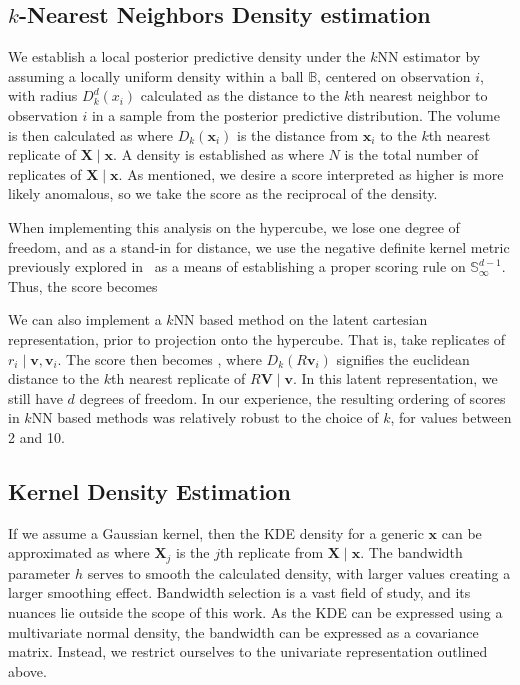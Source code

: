 \subsection{$k$-Nearest Neighbors Density estimation}
We establish a local posterior predictive density under the $k$NN estimator by 
  assuming a locally uniform density within a ball $\mathbb{B}$, centered on 
  observation $i$, with radius $D_{k}^d(x_i)$ calculated as the distance to the 
  $k$th nearest neighbor to observation $i$ in a sample from the posterior 
  predictive distribution. The volume is then calculated as
   where $D_k(\bm{x}_i)$ is the distance from 
  $\bm{x}_i$ to the $k$th nearest replicate of $\bm{X}\mid\bm{x}$.  A density is
  established as  where $N$ is the total number of 
  replicates of $\bm{X}\mid\bm{x}$.  As mentioned, we desire a score interpreted
  as higher is more likely anomalous, so we take the score as the reciprocal of 
  the density.

When implementing this analysis on the hypercube, we lose one degree of freedom,
  and as a stand-in for distance, we use the negative definite kernel metric 
  previously explored in~\cite{trubey:pg} as a means of establishing a proper 
  scoring rule on $\mathbb{S}_{\infty}^{d-1}$.  Thus, the score becomes
  
  We can also implement a $k$NN based method on the latent cartesian
  representation, prior to projection onto the hypercube.  That is, take replicates
  of $r_i\mid \bm{v},\bm{v}_i$.  The score then becomes ,
  where $D_k(R\bm{v}_i)$ signifies the euclidean distance to the $k$th nearest
  replicate of $R\bm{V}\mid\bm{v}$.  In this latent representation, we still have
  $d$ degrees of freedom. In our experience, the resulting ordering of
  scores in $k$NN based methods was relatively robust to the choice of $k$, for 
  values between 2 and 10.

\subsection{Kernel Density Estimation}

If we assume a Gaussian kernel, then the KDE density for a generic $\bm{x}$ can 
  be approximated as  where $\bm{X}_j$ is the $j$th 
  replicate from $\bm{X}\mid\bm{x}$.  The bandwidth parameter $h$ serves to smooth
  the calculated density, with larger values creating a larger smoothing effect.
  Bandwidth selection is a vast field of study, and its nuances lie outside the
  scope of this work.  As the KDE can be expressed using a multivariate normal density,
  the bandwidth can be expressed as a covariance matrix.  Instead, we restrict ourselves
  to the univariate representation outlined above.

